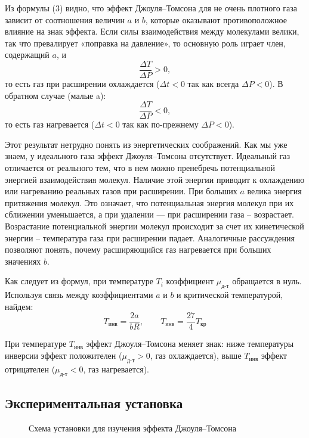 \documentclass[a4paper, 12pt]{article}
\begin{document}
	Из формулы (3) видно, что эффект Джоуля–Томсона для не очень плотного газа зависит от соотношения величин $a$ и $b$, которые оказывают противоположное влияние на знак эффекта. Если силы взаимодействия между молекулами велики, так что превалирует «поправка на давление», то основную роль играет член, содержащий $a$, и
	\[ \frac{\Delta T}{\Delta P} > 0, \]
	то есть газ при расширении охлаждается ($\Delta t < 0$ так как всегда
	$\Delta P < 0$). В обратном случае (малые a):
	\[ \frac{\Delta T}{\Delta P} < 0, \]
	то есть газ нагревается ($\Delta t < 0$ так как по-прежнему $\Delta P < 0$).
	
	Этот результат нетрудно понять из энергетических соображений. Как мы уже знаем, у идеального газа эффект Джоуля–Томсона отсутствует. Идеальный газ отличается от реального тем, что в нем можно пренебречь потенциальной энергией взаимодействия молекул. Наличие этой энергии приводит к охлаждению или нагреванию реальных газов при расширении. При больших $a$ велика энергия притяжения молекул. Это означает, что потенциальная энергия молекул при их сближении уменьшается, а при удалении — при расширении газа -- возрастает. Возрастание потенциальной энергии молекул происходит за счет их кинетической энергии -- температура газа при расширении падает. Аналогичные рассуждения позволяют понять, почему расширяющийся газ нагревается при больших значениях $b$.
	
	Как следует из формул, при температуре $T_i$ коэффициент $\mu_\text{д-т}$ обращается в нуль. Используя связь между коэффициентами $a$ и $b$ и критической температурой, найдем:
	\begin{equation}
		T_{\text{инв}}=\frac{2a}{bR}, \qquad
		T_{\text{инв}}=\frac{27}{4}T_{\text{кр}}
	\end{equation}
	
	При температуре $T_\text{инв}$ эффект Джоуля–Томсона меняет знак: ниже температуры инверсии эффект положителен ($\mu_\text{д-т} > 0$, газ охлаждается), выше $T_\text{инв}$ эффект отрицателен ($\mu_\text{д-т} < 0$, газ нагревается).	
	
\begin{center}
	\subsection*{Экспериментальная установка}
\end{center}

	\begin{figure}[H]
		\caption[]{\label{ust} Схема установки для изучения эффекта Джоуля–Томсона}
	\end{figure}
\end{document}
